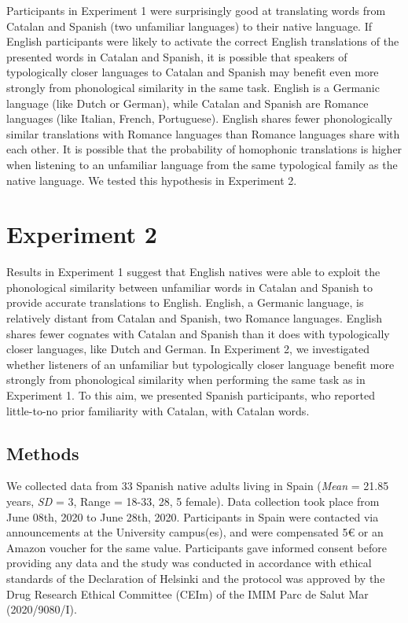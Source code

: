 \documentclass[
]{article}
\begin{document}
Participants in Experiment 1 were surprisingly good at translating words
from Catalan and Spanish (two unfamiliar languages) to their native
language. If English participants were likely to activate the correct
English translations of the presented words in Catalan and Spanish, it
is possible that speakers of typologically closer languages to Catalan
and Spanish may benefit even more strongly from phonological similarity
in the same task. English is a Germanic language (like Dutch or German),
while Catalan and Spanish are Romance languages (like Italian, French,
Portuguese). English shares fewer phonologically similar translations
with Romance languages than Romance languages share with each other. It
is possible that the probability of homophonic translations is higher
when listening to an unfamiliar language from the same typological
family as the native language. We tested this hypothesis in Experiment
2.

\section{Experiment 2}\label{experiment-2}

Results in Experiment 1 suggest that English natives were able to
exploit the phonological similarity between unfamiliar words in Catalan
and Spanish to provide accurate translations to English. English, a
Germanic language, is relatively distant from Catalan and Spanish, two
Romance languages. English shares fewer cognates with Catalan and
Spanish than it does with typologically closer languages, like Dutch and
German. In Experiment 2, we investigated whether listeners of an
unfamiliar but typologically closer language benefit more strongly from
phonological similarity when performing the same task as in Experiment
1. To this aim, we presented Spanish participants, who reported
little-to-no prior familiarity with Catalan, with Catalan words.

\subsection{Methods}\label{methods-1}

We collected data from 33 Spanish native adults living in Spain
(\emph{Mean} = 21.85 years, \emph{SD} = 3, Range = 18-33, 28, 5 female).
Data collection took place from June 08th, 2020 to June 28th, 2020.
Participants in Spain were contacted via announcements at the University
campus(es), and were compensated 5€ or an Amazon voucher for the same
value. Participants gave informed consent before providing any data and
the study was conducted in accordance with ethical standards of the
Declaration of Helsinki and the protocol was approved by the Drug
Research Ethical Committee (CEIm) of the IMIM Parc de Salut Mar
(2020/9080/I).
\end{document}
